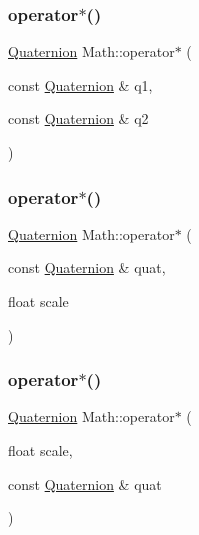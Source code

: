 \mbox{\label{namespace_math_adf16f62e56ee18741a93b0db7a555fe2}} 
\subsubsection{\texorpdfstring{operator$\ast$()}{operator*()}\hspace{0.1cm}{\footnotesize\ttfamily [17/19]}}
{\footnotesize\ttfamily \mbox{\hyperlink{struct_math_1_1_quaternion}{Quaternion}} Math\+::operator$\ast$ (\begin{DoxyParamCaption}\item[{const \mbox{\hyperlink{struct_math_1_1_quaternion}{Quaternion}} \&}]{q1,  }\item[{const \mbox{\hyperlink{struct_math_1_1_quaternion}{Quaternion}} \&}]{q2 }\end{DoxyParamCaption})}

\mbox{\label{namespace_math_a7a53d7e378ecb1c87b7a9fa0745de29f}} 
\subsubsection{\texorpdfstring{operator$\ast$()}{operator*()}\hspace{0.1cm}{\footnotesize\ttfamily [18/19]}}
{\footnotesize\ttfamily \mbox{\hyperlink{struct_math_1_1_quaternion}{Quaternion}} Math\+::operator$\ast$ (\begin{DoxyParamCaption}\item[{const \mbox{\hyperlink{struct_math_1_1_quaternion}{Quaternion}} \&}]{quat,  }\item[{float}]{scale }\end{DoxyParamCaption})}

\mbox{\label{namespace_math_a10e62d95a67155ffedb323e468943905}} 
\subsubsection{\texorpdfstring{operator$\ast$()}{operator*()}\hspace{0.1cm}{\footnotesize\ttfamily [19/19]}}
{\footnotesize\ttfamily \mbox{\hyperlink{struct_math_1_1_quaternion}{Quaternion}} Math\+::operator$\ast$ (\begin{DoxyParamCaption}\item[{float}]{scale,  }\item[{const \mbox{\hyperlink{struct_math_1_1_quaternion}{Quaternion}} \&}]{quat }\end{DoxyParamCaption})}

